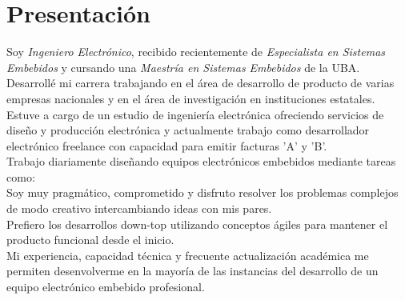 \section{Presentación}
Soy \emph{Ingeniero Electrónico}, recibido recientemente de \emph{Especialista
en Sistemas Embebidos} y cursando una \emph{Maestría en Sistemas Embebidos} de
la UBA. \\
Desarrollé mi carrera trabajando en el área de desarrollo de producto de varias
empresas nacionales y en el área de investigación en instituciones estatales.\\
Estuve a cargo de un estudio de ingeniería electrónica ofreciendo servicios de
diseño y producción electrónica y actualmente trabajo como desarrollador
electrónico freelance con capacidad para emitir facturas 'A' y 'B'.\\
Trabajo diariamente diseñando equipos electrónicos embebidos mediante tareas como: \\
Soy muy pragmático, comprometido y disfruto resolver los problemas complejos de
modo creativo intercambiando ideas con mis pares.\\
Prefiero los desarrollos
down-top utilizando conceptos ágiles para mantener el producto funcional desde
el inicio.\\
Mi experiencia, capacidad técnica y frecuente actualización académica me
permiten desenvolverme en la mayoría de las instancias del desarrollo de un
equipo electrónico embebido profesional.\\
